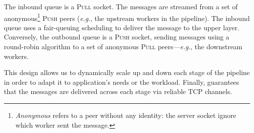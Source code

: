 The inbound queue is a \textsc{Pull} socket.
The messages are streamed from a set of anonymous\footnote{\emph{Anonymous} refers to a peer without any identity: the server socket ignore which worker sent the message.} \textsc{Push} peers (\emph{e.g.}, the upstream workers in the pipeline).
The inbound queue uses a fair-queuing scheduling to deliver the message to the upper layer.
Conversely, the outbound queue is a \textsc{Push} socket, sending messages using a round-robin algorithm to a set of anonymous \textsc{Pull} peers---\emph{e.g.}, the downstream workers.

This design allows us to dynamically scale up and down each stage of the pipeline in order to adapt it to application's needs or the workload.
Finally, \zmq{} guarantees that the messages are delivered across each stage via reliable TCP channels.

